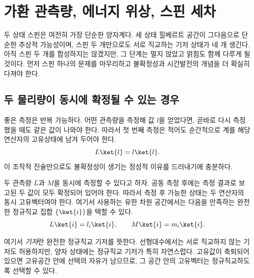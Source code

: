\chapter{가환 관측량, 에너지 위상, 스핀 세차}


두 상태 스핀은 여전히 가장 단순한 양자계다. 세 상태 힐베르트 공간이 그다음으로 단순한 추상적 가능성이며, 스핀 두 개만으로도 서로 직교하는 기저 상태가 네 개 생긴다. 아직 스핀 두 개를 합성하지는 않겠지만, 그 단계는 멀지 않았고 얽힘도 함께 다루게 될 것이다. 먼저 스핀 하나의 문제를 마무리하고 불확정성과 시간발전의 개념을 더 확실히 다져야 한다.

\section{두 물리량이 동시에 확정될 수 있는 경우}

좋은 측정은 반복 가능하다. 어떤 관측량을 측정해 값 \(l\)을 얻었다면, 곧바로 다시 측정했을 때도 같은 값이 나와야 한다. 따라서 첫 번째 측정은 적어도 순간적으로 계를 해당 연산자의 고유상태에 남겨 두어야 한다.
\begin{equation}
L\ket{l}=l\ket{l}.
\end{equation}
이 조작적 진술만으로도 불확정성이 생기는 정성적 이유를 드러내기에 충분하다.

두 관측량 \(L\)과 \(M\)을 동시에 측정할 수 있다고 하자. 공동 측정 후에는 측정 결과로 보고된 두 값이 모두 확정되어 있어야 한다. 따라서 측정 후 가능한 상태는 두 연산자의 동시 고유벡터여야 한다. 여기서 사용하는 유한 차원 공간에서는 다음을 만족하는 완전한 정규직교 집합 \(\{\ket{i}\}\)을 택할 수 있다.
\begin{equation}
L\ket{i}=l_i\ket{i},
\qquad
M\ket{i}=m_i\ket{i}.
\label{eq:l5-common-eigenvectors}
\end{equation}

\begin{remark}
여기서 \emph{기저}란 완전한 정규직교 기저를 뜻한다. 선형대수에서는 서로 직교하지 않는 기저도 허용하지만, 양자 상태에는 정규직교 기저가 특히 자연스럽다. 고유값이 축퇴되어 있으면 고유공간 안에 선택의 자유가 남으므로, 그 공간 안의 고유벡터는 정규직교하도록 선택할 수 있다.
\end{remark}


